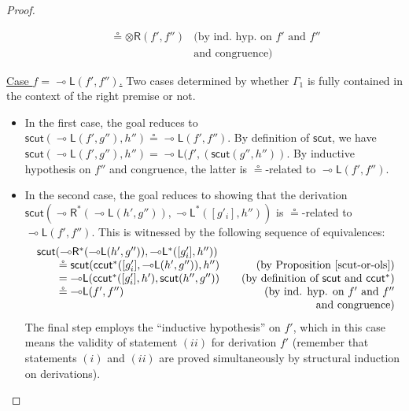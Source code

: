 \documentclass[sn-mathphys-num]{sn-jnl}%
\newcommand{\GG}{\Gamma}
\newcommand{\tr}{\otimes\mathsf{R}}
\newcommand{\lolli}{\multimap}
\newcommand{\lleft}{{\lolli}\mathsf{L}}
\newcommand{\lright}{{\lolli}\mathsf{R}}
\newcommand{\mf}[1]{\mathsf{#1}}
\newcommand{\scut}[2]{\mf{scut} (#1 , #2)}
\theoremstyle{thmstyleone}%
\theoremstyle{thmstyletwo}%
\theoremstyle{thmstylethree}%
\begin{document}
\begin{proof}
\begin{itemize}
\[\begin{array}{lr}
        \qquad \circeq \tr (f',f'')
        & \text{(by ind. hyp. on $f'$ and $f''$}\\
        & \text{and congruence)}
      \end{array}
      \]
  \end{itemize}
  \underline{Case $f = \lleft (f',f'')$.} Two cases determined by whether $\GG_1$ is fully contained in the context of the right premise or not.
  \begin{itemize}
    \item In the first case, the goal reduces to $\scut{\lleft(f',g'')}{h''} \circeq \lleft (f' , f'')$. By definition of $\mf{scut}$, we have $\scut{\lleft(f',g'')}{h''} = \lleft(f', (\scut{g''}{h''})$. By inductive hypothesis on $f''$ and congruence, the latter is $\circeq$-related to $\lleft (f' , f'')$.
    \item In the second case, the goal reduces to showing that the derivation $\mf{scut}(\lright^* (\lleft(h',g'')),\lleft^*([g'_i],h''))$ is $\circeq$-related to $\lleft (f',f'')$. This is witnessed by the following sequence of equivalences:
  \[\arraycolsep=10pt    
      \begin{array}{lr}
        \mf{scut}(\lright^* (\lleft(h',g'')),\lleft^*([g'_i],h'')) \\
        \qquad \circeq \mf{scut}(\mf{ccut^*}([g'_i],\lleft(h',g'')),h'')
        & \text{(by Proposition \ref{scut-or-ols})} \\
        \qquad = \lleft(\mf{ccut^*}([g'_i],h'),\mf{scut}(h'',g''))
        & \text{(by definition of $\mf{scut}$ and $\mf{ccut^*}$)} \\
        \qquad \circeq \lleft (f',f'')
        & \text{(by ind. hyp. on $f'$ and $f''$}\\
        & \text{and congruence)}
      \end{array}
      \]
      The final step employs the ``inductive hypothesis'' on $f'$, which in this case means the validity of statement $(ii)$ for derivation $f'$ (remember that statements $(i)$ and $(ii)$ are proved simultaneously by structural induction on derivations).
  \end{itemize}
\end{proof}
\end{document}
